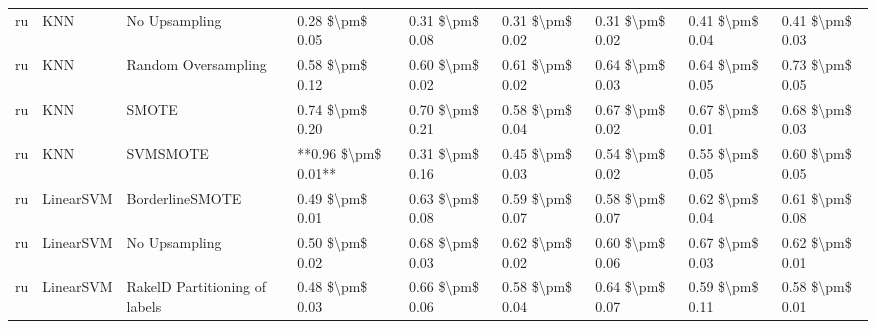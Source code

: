 \begin{tabular}{lllllllll}
      ru &                             KNN &                 No Upsampling &     0.28 \$\textbackslash pm\$ 0.05 &           0.31 \$\textbackslash pm\$ 0.08 &       0.31 \$\textbackslash pm\$ 0.02 &        0.31 \$\textbackslash pm\$ 0.02 &                         0.41 \$\textbackslash pm\$ 0.04 &     0.41 \$\textbackslash pm\$ 0.03 \\
      ru &                             KNN &           Random Oversampling &     0.58 \$\textbackslash pm\$ 0.12 &           0.60 \$\textbackslash pm\$ 0.02 &       0.61 \$\textbackslash pm\$ 0.02 &        0.64 \$\textbackslash pm\$ 0.03 &                         0.64 \$\textbackslash pm\$ 0.05 &     0.73 \$\textbackslash pm\$ 0.05 \\
      ru &                             KNN &                         SMOTE &     0.74 \$\textbackslash pm\$ 0.20 &           0.70 \$\textbackslash pm\$ 0.21 &       0.58 \$\textbackslash pm\$ 0.04 &        0.67 \$\textbackslash pm\$ 0.02 &                         0.67 \$\textbackslash pm\$ 0.01 &     0.68 \$\textbackslash pm\$ 0.03 \\
      ru &                             KNN &                      SVMSMOTE & **0.96 \$\textbackslash pm\$ 0.01** &           0.31 \$\textbackslash pm\$ 0.16 &       0.45 \$\textbackslash pm\$ 0.03 &        0.54 \$\textbackslash pm\$ 0.02 &                         0.55 \$\textbackslash pm\$ 0.05 &     0.60 \$\textbackslash pm\$ 0.05 \\
      ru &                       LinearSVM &               BorderlineSMOTE &     0.49 \$\textbackslash pm\$ 0.01 &           0.63 \$\textbackslash pm\$ 0.08 &       0.59 \$\textbackslash pm\$ 0.07 &        0.58 \$\textbackslash pm\$ 0.07 &                         0.62 \$\textbackslash pm\$ 0.04 &     0.61 \$\textbackslash pm\$ 0.08 \\
      ru &                       LinearSVM &                 No Upsampling &     0.50 \$\textbackslash pm\$ 0.02 &           0.68 \$\textbackslash pm\$ 0.03 &       0.62 \$\textbackslash pm\$ 0.02 &        0.60 \$\textbackslash pm\$ 0.06 &                         0.67 \$\textbackslash pm\$ 0.03 &     0.62 \$\textbackslash pm\$ 0.01 \\
      ru &                       LinearSVM & RakelD Partitioning of labels &     0.48 \$\textbackslash pm\$ 0.03 &           0.66 \$\textbackslash pm\$ 0.06 &       0.58 \$\textbackslash pm\$ 0.04 &        0.64 \$\textbackslash pm\$ 0.07 &                         0.59 \$\textbackslash pm\$ 0.11 &     0.58 \$\textbackslash pm\$ 0.01 \\

\end{tabular}
